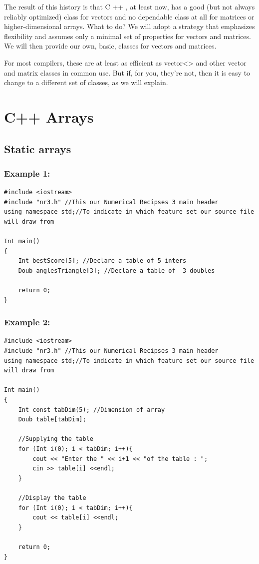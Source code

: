 \documentclass[12pt]{report}
\begin{document}
The result of this history is that C ++ , at least now, has a good (but not always
reliably optimized) class for vectors and no dependable class at all for matrices or
higher-dimensional arrays. What to do? We will adopt a strategy that emphasizes
flexibility and assumes only a minimal set of properties for vectors and matrices.
We will then provide our own, basic, classes for vectors and matrices\cite{nr3ed}. 

For most
compilers, these are at least as efficient as vector<> and other vector and matrix
classes in common use. But if, for you, they’re not, then it is easy to change to a
different set of classes, as we will explain.


\section{C++ Arrays}
\subsection{Static arrays}

\subsubsection{Example 1: }
\begin{lstlisting}[style=CStyle]
#include <iostream>
#include "nr3.h" //This our Numerical Recipses 3 main header
using namespace std;//To indicate in which feature set our source file will draw from

Int main()
{
    Int bestScore[5]; //Declare a table of 5 inters
    Doub anglesTriangle[3]; //Declare a table of  3 doubles
    
    return 0;
}
\end{lstlisting}

\subsubsection{Example 2: }
\begin{lstlisting}[style=CStyle]
#include <iostream>
#include "nr3.h" //This our Numerical Recipses 3 main header
using namespace std;//To indicate in which feature set our source file will draw from

Int main()
{
    Int const tabDim(5); //Dimension of array
    Doub table[tabDim]; 
    
    //Supplying the table
    for (Int i(0); i < tabDim; i++){
        cout << "Enter the " << i+1 << "of the table : ";
        cin >> table[i] <<endl;
    }
    
    //Display the table
    for (Int i(0); i < tabDim; i++){
        cout << table[i] <<endl;
    }
    
    return 0;
}
\end{lstlisting}
\end{document}
